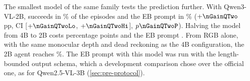 The smallest model of the same family tests the prediction further. With Qwen3-VL-2B, \ours succeeds in \nSQTwo\% of the episodes and the EB prompt in \nEBQTwo\% (${+}\nGainQTwo$\,pp, CI [${+}\nGainQTwoLo$, ${+}\nGainQTwoHi$], $p\nGainQTwoP$). Halving the model from 4B to 2B costs \ours \nDropSQTwo{} percentage points and the EB prompt \nDropEBQTwo. From RGB alone, with the same monocular depth and dead reckoning as the 4B configuration, the 2B agent reaches \nRGBQTwo\%. The EB prompt with this model was run with the length-bounded output schema, which a development comparison chose over the official one, as for Qwen2.5-VL-3B (\cref{sec:pre-protocol}).
